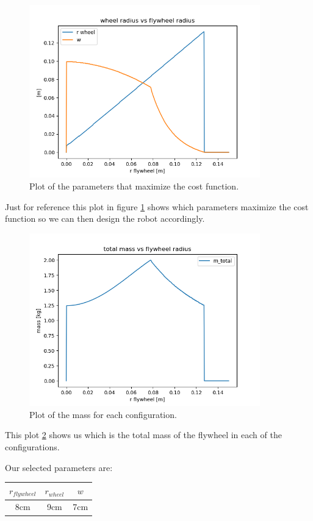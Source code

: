 \begin{figure}[H]
	\centering
	\includegraphics[width=10cm]{img/optimization/parameters.png}
	\caption{Plot of the parameters that maximize the cost function.}
	\label{fig:Parameters plot}
\end{figure}
Just for reference this plot in figure \ref{fig:Parameters plot} shows which parameters maximize the cost function so we can then design the robot accordingly.

\begin{figure}[H]
	\centering
	\includegraphics[width=10cm]{img/optimization/mass.png}
	\caption{Plot of the mass for each configuration.}
	\label{fig:Mass plot}
\end{figure}
This plot \ref{fig:Mass plot} shows us which is the total mass of the flywheel in each of the configurations.

Our selected parameters are:
\begin{center}
	\begin{tabular}{ |c|c|c| } 
	 \hline
	 $r_{flywheel}$ & $r_{wheel}$ & $w$ \\
	 \hline 
	 8cm & 9cm & 7cm \\ 
	 \hline
	\end{tabular}
	\end{center}

